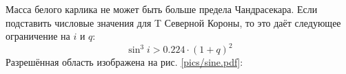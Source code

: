 
Масса белого карлика не может быть больше предела Чандрасекара. Если подставить числовые значения для T Северной Короны, то это даёт следующее ограничение на $i$ и $q$:
\[
\sin^3 i > 0.224 \cdot (1 + q)^2
\]
Разрешённая область изображена на рис. \ref{pics/sine.pdf}:











